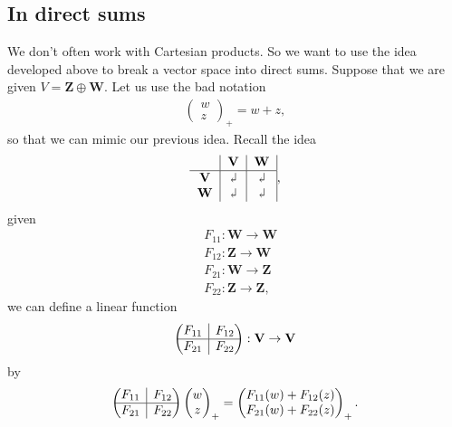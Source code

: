 \documentclass{book}
\theoremstyle{definition}
\newcommand{\V}{\mathbf{V}}
\newcommand{\W}{\mathbf{W}}
\newcommand{\Z}{\mathbf{Z}}
\newcommand{\gives}{\rotatebox[origin=c]{180}{$\Rsh$}	}
\newcommand{\rvline}{\hspace*{-\arraycolsep}\vline\hspace*{-\arraycolsep}}
\begin{document}
\subsection{In direct sums}
We don't often work with Cartesian products. So we want to use the idea developed above to break a vector space into direct sums. Suppose that we are given $V = \Z \oplus \W$. Let us use the bad notation
\begin{align*}
\begin{pmatrix}
w\\z
\end{pmatrix}_+ = w + z,
\end{align*}
so that we can mimic our previous idea. Recall the idea 
\begin{align*}
\begin{tabular}{c|c|c|}
& $\V$ & $\W$\\
\hline
$\V$& $\gives$& $\gives$\\	
$\W$& $\gives$ & $\gives$
\end{tabular},
\end{align*}
given 
\begin{align*}
&F_{11} : \W \to \W\\
&F_{12} : \Z \to \W\\
&F_{21} : \W \to \Z\\
&F_{22} : \Z \to \Z,
\end{align*}
we can define a linear function
\begin{align*}
\begin{pmatrix}
\begin{matrix}
F_{11}
\end{matrix}
& \rvline & F_{12} \\
\hline
F_{21} & \rvline &
F_{22}
\end{pmatrix} : \V \to \V
\end{align*}
by 
\begin{align*}
\begin{pmatrix}
\begin{matrix}
F_{11}
\end{matrix}
& \rvline & F_{12} \\
\hline
F_{21} & \rvline &
F_{22}
\end{pmatrix}\begin{pmatrix}
w\\z
\end{pmatrix}_+ = \begin{pmatrix}
F_{11}(w) + F_{12}(z)\\
F_{21}(w) + F_{22}(z)
\end{pmatrix}_+.
\end{align*}
\end{document}
